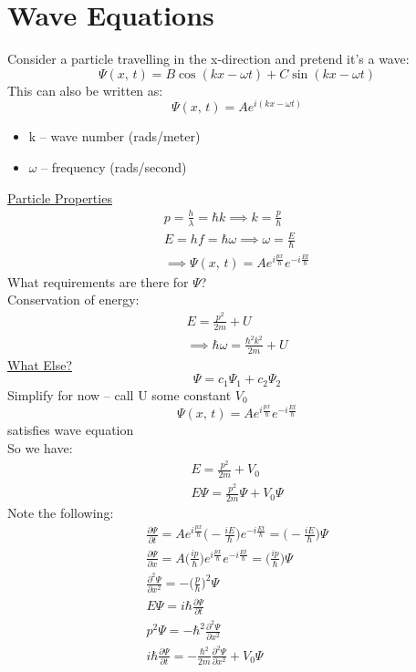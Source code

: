 \documentclass[a4paper, 11pt, fleqn, normalem]{report}
\begin{document}
\section{Wave Equations}
Consider a particle travelling in the x-direction and pretend it's a wave:
\begin{equation*}
    \Psi(x,\,t) = B\cos(kx - \omega t) + C\sin(kx - \omega t)
\end{equation*}
This can also be written as:
\begin{equation*}
    \Psi(x,\,t) = Ae^{i(kx - \omega t)}
\end{equation*}
\begin{itemize}
    \item k -- wave number (rads/meter)
    \item $\omega$ -- frequency (rads/second)
\end{itemize}
\vspace{10pt}
\underline{Particle Properties}
\begin{gather*}
    p = \frac{h}{\lambda} = \hbar k \implies k = \frac{p}{\hbar} \\
    E = hf = \hbar\omega \implies \omega = \frac{E}{\hbar} \\
    \implies \Psi(x,\,t) = Ae^{i\tfrac{px}{\hbar}}e^{-i\tfrac{Et}{\hbar}}
\end{gather*}
What requirements are there for $\Psi$? \\
Conservation of energy:
\begin{gather*}
    E = \frac{p^{2}}{2m} + U \\
    \implies \hbar\omega = \frac{\hbar^{2}k^{2}}{2m} + U
\end{gather*}
\underline{What Else?}
\begin{equation*}
    \Psi = c_{1}\Psi_{1} + c_{2}\Psi_{2}
\end{equation*}
Simplify for now -- call U some constant $V_{0}$
\begin{equation*}
    \Psi(x,\,t) = Ae^{i\tfrac{px}{\hbar}}e^{-i\tfrac{Et}{\hbar}}
\end{equation*}
satisfies wave equation \\
So we have:
\begin{gather*}
    E = \frac{p^{2}}{2m} + V_{0} \\
    E\Psi = \frac{p^{2}}{2m}\Psi + V_{0}\Psi
\end{gather*}
Note the following:
\begin{gather*}
    \frac{\partial \Psi}{\partial t} = Ae^{i\tfrac{px}{\hbar}}\Big(-\frac{iE}{\hbar}\Big)e^{-i\tfrac{Et}{\hbar}} = \Big(-\frac{iE}{\hbar}\Big)\Psi \\
    \frac{\partial \Psi}{\partial x} = A\Big(\frac{ip}{\hbar}\Big)e^{i\tfrac{px}{\hbar}}e^{-i\tfrac{Et}{\hbar}} = \Big(\frac{ip}{\hbar}\Big)\Psi \\
    \frac{\partial^{2} \Psi}{\partial x^{2}} = -\Big(\frac{p}{\hbar}\Big)^{2}\Psi \\
    E\Psi = i\hbar\frac{\partial \Psi}{\partial t} \\
    p^{2}\Psi = -\hbar^{2}\frac{\partial^{2} \Psi}{\partial x^{2}} \\
    i\hbar\frac{\partial \Psi}{\partial t} = -\frac{\hbar^{2}}{2m}\frac{\partial^{2} \Psi}{\partial x^{2}} + V_{0}\Psi
\end{gather*}
\end{document}
